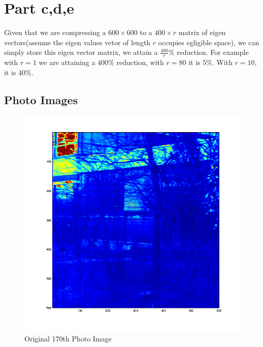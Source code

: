 \documentclass[12pt,english]{article}
\begin{document}
\newpage
\section{Part c,d,e}

Given that we are compressing a $600\times 600$ to a $400\times r$ matrix of eigen vectors(assume the eigen values vetor of length $r$ occupies egligible 
space),
we can simply store this eigen vector matrix, we attain a $\frac{400}{r}\%$ reduction.
For example with $r=1$ we are attaining a $400\%$ reduction, with $r=80$ it is $5\%$.
With $r=10$, it is $40\%$.

\subsection{ Photo Images }
\begin{figure}
\begin{minipage}{0.5\linewidth}
    \includegraphics[width=\linewidth]{pca-part-c-Photo_Images-original.png}
    \caption{\footnotesize{Original 170th Photo Image}}
\end{minipage}
\begin{minipage}{0.5\linewidth}

\end{minipage}
\end{figure}
\end{document}
